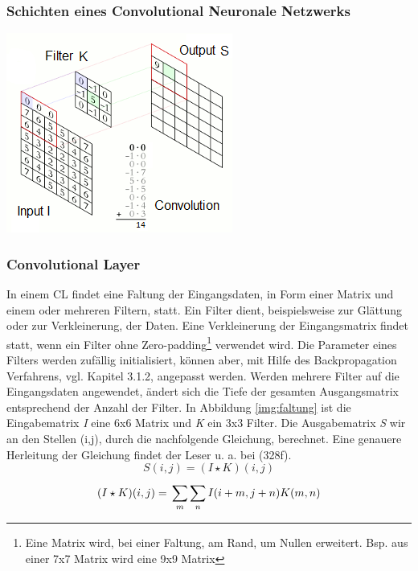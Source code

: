 \documentclass[twosided,a4,10pt]{article}
\begin{document}
\begin{multicols}{2}
		\subsubsection{Schichten eines Convolutional Neuronale Netzwerks}
		\begin{minipage}{0.45\textwidth}
			\centering
			\includegraphics{img/faltung2.png}
			\label{img:faltung}
		\end{minipage}\newline
		\subsubsection*{Convolutional Layer}
		In einem CL findet eine Faltung der Eingangsdaten, in Form einer Matrix und einem oder mehreren Filtern, statt. Ein Filter dient, beispielsweise zur Glättung oder zur Verkleinerung, der Daten. Eine Verkleinerung der Eingangsmatrix findet statt, wenn ein Filter ohne Zero-padding\footnote[11]{Eine Matrix wird, bei einer Faltung, am Rand, um Nullen erweitert. Bsp. aus einer 7x7 Matrix wird eine 9x9 Matrix} verwendet wird. Die Parameter eines Filters werden zufällig initialisiert, können aber, mit Hilfe des Backpropagation Verfahrens, vgl. Kapitel 3.1.2, angepasst werden. Werden mehrere Filter auf die Eingangsdaten angewendet, ändert sich die Tiefe der gesamten Ausgangsmatrix entsprechend der Anzahl der Filter. \cite{karpathy}\newline
		In Abbildung \ref{img:faltung} ist die Eingabematrix \textit{I} eine 6x6 Matrix und \textit{K} ein 3x3 Filter. Die Ausgabematrix \textit{S} wir an den Stellen (i,j), durch die nachfolgende Gleichung, berechnet. Eine genauere Herleitung der Gleichung findet der Leser u. a. bei \cite{goodfellow}(328f).\newline\\	
		\begin{equation*}
		S(i,j) =(I \star K)(i,j)
		\end{equation*}
		\begin{equation*}
		(I \star K)(i,j) =\newline\sum_{m}^{}\sum_{n}^{}I(i+m,j+n)K(m,n)
		\end{equation*}\newline

\end{multicols}
\end{document}
